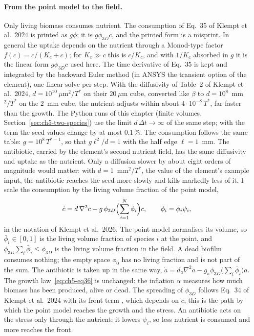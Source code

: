 \paragraph{From the point model to the field.}
Only living biomass consumes nutrient. The consumption of Eq.~35 of Klempt et al.\ 2024 is printed as
$g\phi$; it is $g\phi_{3D}c$, and the printed form is a misprint.
In general the uptake depends on the nutrient through a Monod-type factor $f(c)=c/(K_c+c)$; for
$K_c\gg c$ this is $c/K_c$, and with $1/K_c$ absorbed in $g$ it is the linear form $g\phi_{3D}c$ used here.
The time derivative of Eq.~35 is kept and integrated by the backward Euler method (in ANSYS the transient option of the
element), one linear solve per step. With the diffusivity of Table~2 of Klempt et al.\ 2024, $d=10^{10}~\mu$m$^2/T^*$
on their $20~\mu$m cube, converted like $\beta$ to $d=10^8$~mm$^2/T^*$ on the $2$~mm cube, the nutrient adjusts within
about $4\cdot10^{-8}\,T^*$, far faster than the growth. The Python runs of this chapter (finite volumes, Section~\ref{sec:ch5-two-species}) use the limit $d\,\Delta t\to\infty$
of the same step; with the term the seed values change by at most $0.1\,\%$. The consumption follows the same table: $g=10^8\,T^{*-1}$, so that $g\ell^2/d=1$ with the half edge
$\ell=1$~mm. The antibiotic, carried by the element's second nutrient field, has the same diffusivity and uptake as the nutrient. Only a diffusion
slower by about eight orders of magnitude would matter: with $d=1$~mm$^2/T^*$, the value of the element's example
input, the antibiotic reaches the seed more slowly and kills markedly less of it.
I scale the consumption by the living volume
fraction of the point model,
\begin{equation}
\dot c=d\,\nabla^2c-g\,\phi_{3D}\Bigl(\sum_{i=1}^N\bar\phi_i\Bigr)c,\qquad \bar\phi_i=\phi_i\psi_i,
\label{eq:ch5-consumption}
\end{equation}
in the notation of Klempt et al.\ 2026. The point model normalises its volume, so $\bar\phi_i\in[0,1]$
is the living volume fraction of species $i$ at the point, and $\phi_{3D}\sum_i\bar\phi_i\le\phi_{3D}$
is the living volume fraction in the field. A dead biofilm consumes nothing; the empty space $\phi_0$ has no
living fraction and is not part of the sum. The antibiotic is taken up in the same way,
$\dot a=d_a\nabla^2a-g_a\phi_{3D}\bigl(\sum_i\bar\phi_i\bigr)a$. The growth law~\eqref{eq:ch5-eq36} is
unchanged: the inflation $\alpha$ measures how much biomass has been produced, alive or dead. The
spreading of $\phi_{3D}$ follows Eq.~34 of Klempt et al.\ 2024 with its front term \fterm{}, which depends on
$c$; this is the path by which the point model reaches the growth and the stress. An antibiotic acts on
the stress only through the nutrient: it lowers $\psi_i$, so less nutrient is consumed and more reaches the front.

